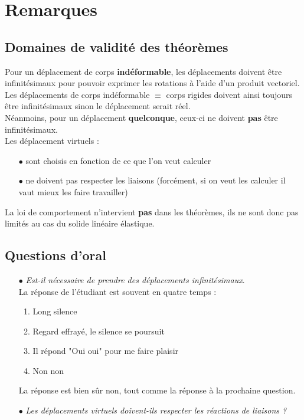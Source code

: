 \section{Remarques}
	\subsection{Domaines de validité des théorèmes}
	Pour un déplacement de corps \textbf{indéformable}, les déplacements doivent 
	être infinitésimaux pour pouvoir exprimer les rotations à l'aide d'un produit 
	vectoriel. Les déplacements de corps indéformable $\equiv$ corps rigides 
	doivent ainsi toujours être infinitésimaux sinon le déplacement serait réel.\\
	
	Néanmoins, pour un déplacement \textbf{quelconque}, ceux-ci ne doivent 
	\textbf{pas} être infinitésimaux. \\
	
	Les déplacement virtuels :
	\begin{itemize}
	\item[$\bullet$] sont choisis en fonction de ce que l'on veut calculer
	\item[$\bullet$] ne doivent pas respecter les liaisons (forcément, si on veut 
	les calculer il vaut mieux les faire travailler)
	\end{itemize}
	
	\danger La loi de comportement n'intervient \textbf{pas} dans les théorèmes, 
	ils ne sont donc pas limités au cas du solide linéaire élastique.
	
	\subsection{Questions d'oral}
	\begin{itemize}
	\item[$\bullet$] \textit{Est-il nécessaire de prendre des déplacements 
	infinitésimaux}. \\
	La réponse de l'étudiant est souvent en quatre temps :
	\begin{enumerate}
	\item Long silence
	\item Regard effrayé, le silence se poursuit
	\item Il répond "Oui oui" pour me faire plaisir
	\item Non non
	\end{enumerate}
	La réponse est bien sûr non, tout comme la réponse à la prochaine question.
	\item[$\bullet$] \textit{Les déplacements virtuels doivent-ils respecter les 
	réactions de liaisons ?}
	\end{itemize}
